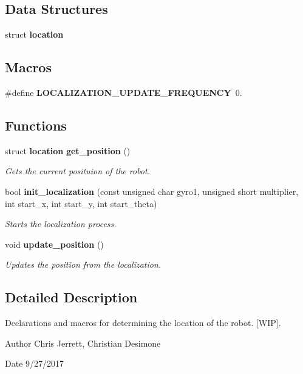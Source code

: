 \subsection*{Data Structures}
\begin{DoxyCompactItemize}
\item 
struct \textbf{ location}
\end{DoxyCompactItemize}
\subsection*{Macros}
\begin{DoxyCompactItemize}
\item 
\#define \textbf{ L\+O\+C\+A\+L\+I\+Z\+A\+T\+I\+O\+N\+\_\+\+U\+P\+D\+A\+T\+E\+\_\+\+F\+R\+E\+Q\+U\+E\+N\+CY}~0.
\end{DoxyCompactItemize}
\subsection*{Functions}
\begin{DoxyCompactItemize}
\item 
struct \textbf{ location} \textbf{ get\+\_\+position} ()
\begin{DoxyCompactList}\small\item\em Gets the current posituion of the robot. \end{DoxyCompactList}\item 
bool \textbf{ init\+\_\+localization} (const unsigned char gyro1, unsigned short multiplier, int start\+\_\+x, int start\+\_\+y, int start\+\_\+theta)
\begin{DoxyCompactList}\small\item\em Starts the localization process. \end{DoxyCompactList}\item 
void \textbf{ update\+\_\+position} ()
\begin{DoxyCompactList}\small\item\em Updates the position from the localization. \end{DoxyCompactList}\end{DoxyCompactItemize}


\subsection{Detailed Description}
Declarations and macros for determining the location of the robot. [W\+IP]. 

\begin{DoxyAuthor}{Author}
Chris Jerrett, Christian Desimone 
\end{DoxyAuthor}
\begin{DoxyDate}{Date}
9/27/2017 
\end{DoxyDate}


